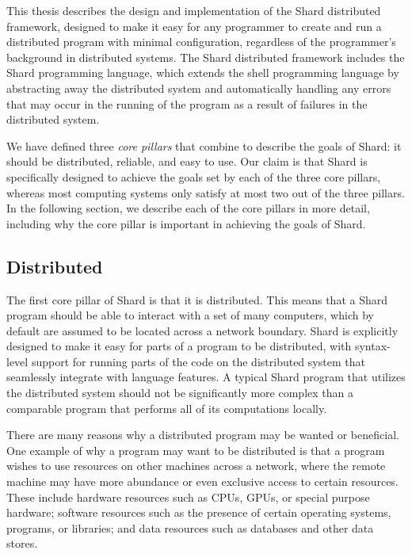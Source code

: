 \documentclass[twoside]{report}
\begin{document}
This thesis describes the design and implementation of the Shard distributed framework, designed to make it easy for any programmer to create and run a distributed program with minimal configuration, regardless of the programmer's background in distributed systems. The Shard distributed framework includes the Shard programming language, which extends the shell programming language by abstracting away the distributed system and automatically handling any errors that may occur in the running of the program as a result of failures in the distributed system.

We have defined three \textit{core pillars} that combine to describe the goals of Shard: it should be distributed, reliable, and easy to use. Our claim is that Shard is specifically designed to achieve the goals set by each of the three core pillars, whereas most computing systems only satisfy at most two out of the three pillars.
In the following section, we describe each of the core pillars in more detail, including why the core pillar is important in achieving the goals of Shard.

\subsection{Distributed}

The first core pillar of Shard is that it is distributed.
This means that a Shard program should be able to interact with a set of many computers, which by default are assumed to be located across a network boundary.
Shard is explicitly designed to make it easy for parts of a program to be distributed, with syntax-level support for running parts of the code on the distributed system that seamlessly integrate with language features.
A typical Shard program that utilizes the distributed system should not be significantly more complex than a comparable program that performs all of its computations locally.

There are many reasons why a distributed program may be wanted or beneficial.
One example of why a program may want to be distributed is that a program wishes to use resources on other machines across a network, where the remote machine may have more abundance or even exclusive access to certain resources.
These include hardware resources such as CPUs, GPUs, or special purpose hardware; software resources such as the presence of certain operating systems, programs, or libraries; and data resources such as databases and other data stores.
\end{document}
